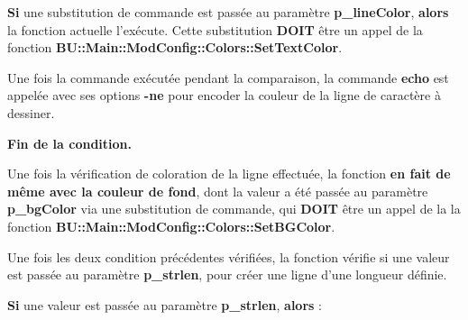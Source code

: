 \documentclass[a4paper,10pt]{article}
\begin{document}
\begin{justify}
    \textbf{\color{brick}Si} une substitution de commande est passée au paramètre \textbf{\color{orange}p\_lineColor}, \textbf{\color{brick}alors} la fonction actuelle l'exécute. Cette substitution \textbf{DOIT} être un appel de la fonction \textbf{\color{mauve}BU::Main::ModConfig::Colors::SetTextColor}.
\end{justify}

\begin{justify}
    Une fois la commande exécutée pendant la comparaison, la commande \textbf{\color{gray}echo} est appelée avec ses options \textbf{\color{gray}-ne} pour encoder la couleur de la ligne de caractère à dessiner.
\end{justify}

\begin{justify}
    \textbf{\color{brick}Fin de la condition.}
\end{justify}\setlength{\parskip}{2em}


\begin{justify}
    Une fois la vérification de coloration de la ligne effectuée, la fonction \textbf{\color{brick}en fait de même avec la couleur de fond}, dont la valeur a été passée au paramètre \textbf{\color{orange}p\_bgColor} via une substitution de commande, qui \textbf{DOIT} être un appel de la la fonction \textbf{\color{mauve}BU::Main::ModConfig::Colors::SetBGColor}.
\end{justify}\setlength{\parskip}{1em}

\begin{justify}
    Une fois les deux condition précédentes vérifiées, la fonction vérifie si une valeur est passée au paramètre \textbf{\color{orange}p\_strlen}, pour créer une ligne d'une longueur définie.
\end{justify}\setlength{\parskip}{2em}

\begin{justify}
    \textbf{\color{brick}Si} une valeur est passée au paramètre \textbf{\color{orange}p\_strlen}, \textbf{\color{brick}alors} :\par
\end{justify}\setlength{\parskip}{1em}
\end{document}
